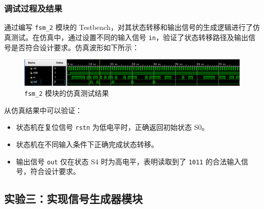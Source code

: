 \documentclass[zihao=5, UTF8]{article}
\theoremstyle{MyLineTheoremStyle} %
\theoremstyle{MyBlockTheoremStyle} %
\theoremstyle{MySubsubsectionStyle} %
\begin{document}
\subsubsection{调试过程及结果}  
通过编写 \texttt{fsm\_2} 模块的 Testbench，对其状态转移和输出信号的生成逻辑进行了仿真测试。在仿真中，通过设置不同的输入信号 \texttt{in}，验证了状态转移路径及输出信号是否符合设计要求。仿真波形如下所示：  
\begin{figure}[htbp]  
    \centering  
    \includegraphics[width=\textwidth]{fsm_2.png} %
    \caption{\texttt{fsm\_2} 模块的仿真测试结果}  
    \label{fig:fsm_2_simulation}  
\end{figure}  

从仿真结果中可以验证：  
\begin{itemize}  
    \item 状态机在复位信号 \texttt{rstn} 为低电平时，正确返回初始状态 S0。  
    \item 状态机在不同输入条件下正确完成状态转移。  
    \item 输出信号 \texttt{out} 仅在状态 S4 时为高电平，表明读取到了 \texttt{1011} 的合法输入信号，符合设计要求。  
\end{itemize}  


\subsection{实验三：实现信号生成器模块}  
\end{document}
